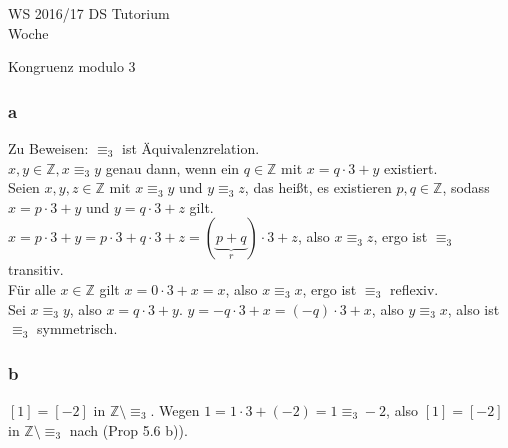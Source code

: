 \documentclass[a4paper,graphics,11pt]{article}
\newcommand\aufgabenteil[1]{\subsubsection*{#1}}
\begin{document}
\noindent WS 2016/17        							\hfill DS Tutorium \\
\noindent Woche                       

\begin{center}
Kongruenz modulo 3
\end{center}
\aufgabenteil{a}
Zu Beweisen: $\equiv_{3}$ ist {\"A}quivalenzrelation.\\
$x,y \in \mathbb{Z}, x \equiv_{3} y$ genau dann, wenn ein $q \in \mathbb{Z}$ mit $x=q \cdot 3+y$ existiert.\\
Seien $x,y,z \in \mathbb{Z}$ mit $x \equiv_{3} y$ und $y \equiv_{3} z$, das hei{\ss}t, es existieren $p,q \in \mathbb{Z}$, sodass $x=p \cdot 3+y$ und $y=q \cdot 3+z$ gilt.\\
$x=p \cdot 3+y = p \cdot 3+q \cdot 3+z = (\underbrace{p+q}_{r}) \cdot 3+z$, also $x \equiv_{3} z$, ergo ist $\equiv_{3}$ transitiv.\\
F{\"u}r alle $x \in \mathbb{Z}$ gilt $x=0 \cdot 3+x=x$, also $x \equiv_{3} x$, ergo ist $\equiv_{3}$ reflexiv.\\
Sei $x \equiv_{3} y$, also $x=q \cdot 3+y$.
$y=-q \cdot 3+x=(-q) \cdot 3+x$, also $y \equiv_{3} x$, also ist $\equiv_{3}$ symmetrisch.
\aufgabenteil{b}
$[1]=[-2]$ in $\mathbb{Z} \setminus \equiv_{3}$.
Wegen $1=1 \cdot 3 + (-2) = 1 \equiv_{3} -2$, also $[1]=[-2]$ in $\mathbb{Z} \setminus \equiv_{3}$ nach (Prop 5.6 b)).
\end{document}

